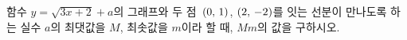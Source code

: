 \hspace*{2mm}\begin{minipage}[t]{\dimexpr\linewidth-2mm\relax}\vspace{0pt}
함수 $y=\sqrt{3x+2}+a$의 그래프와 두 점~$(0,\mkern3mu 1)$, $(2,\mkern3mu -2)$를 잇는 선분이 만나도록 하는 실수 $a$의 최댓값을 $M$, 최솟값을 $m$이라 할 때, $Mm$의 값을 구하시오.\end{minipage}
